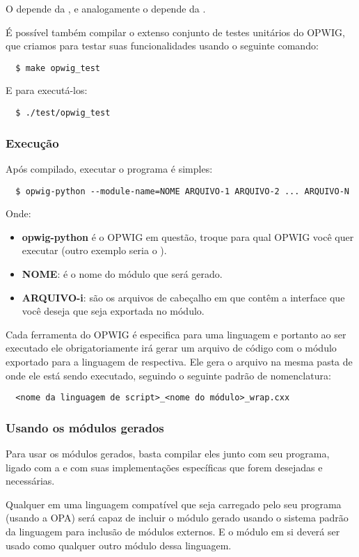 O  depende da , e analogamente o 
depende da .

É possível também compilar o extenso conjunto de testes unitários do OPWIG, que
criamos para testar suas funcionalidades usando o seguinte comando:
\begin{verbatim}
  $ make opwig_test
\end{verbatim}
E para executá-los:
\begin{verbatim}
  $ ./test/opwig_test
\end{verbatim}

\subsubsection{Execução}
Após compilado, executar o programa é simples:
\begin{verbatim}
  $ opwig-python --module-name=NOME ARQUIVO-1 ARQUIVO-2 ... ARQUIVO-N
\end{verbatim}
Onde:
\begin{itemize}
  \item \textbf{opwig-python} é o OPWIG em questão, troque para qual OPWIG você quer executar 
    (outro exemplo seria o ).
  \item \textbf{NOME}: é o nome do módulo que será gerado.
  \item \textbf{ARQUIVO-i}: são os arquivos de cabeçalho em \CXX{} que contêm a interface
    que você deseja que seja exportada no módulo.
\end{itemize}

Cada ferramenta do OPWIG é especifica para uma linguagem e portanto ao ser executado
ele obrigatoriamente irá gerar um arquivo de código com o módulo exportado para a
linguagem de \script{} respectiva. Ele gera o arquivo na mesma pasta de onde ele está 
sendo executado, seguindo o seguinte padrão de nomenclatura:
\begin{verbatim}
  <nome da linguagem de script>_<nome do módulo>_wrap.cxx
\end{verbatim}

\subsubsection{Usando os módulos gerados}
Para usar os módulos gerados, basta compilar eles junto com seu programa, ligado com
a  e com suas implementações específicas que forem desejadas e
necessárias.

Qualquer \script{} em uma linguagem compatível que seja carregado pelo seu programa
(usando a OPA) será capaz de incluir o módulo gerado usando o sistema padrão da
linguagem para inclusão de módulos externos. E o módulo em si deverá ser
usado como qualquer outro módulo dessa linguagem.
